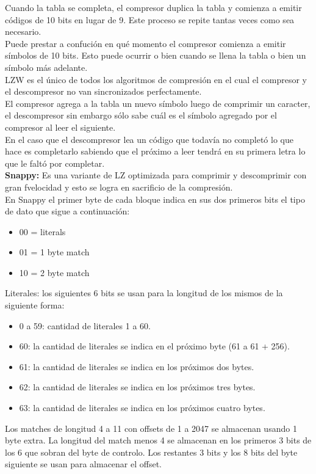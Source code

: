 \documentclass[titlepage,a4paper]{article}
\begin{document}
Cuando la tabla se completa, el compresor duplica la tabla y comienza a emitir códigos de 10 bits en lugar de 9. Este proceso se repite tantas veces como sea necesario. \\

Puede prestar a confución en qué momento el compresor comienza a emitir símbolos de 10 bits. Esto puede ocurrir o bien cuando se llena la tabla o bien un símbolo más adelante. \\

LZW es el único de todos los algoritmos de compresión en el cual el compresor y el descompresor no van sincronizados perfectamente. \\
El compresor agrega a la tabla un nuevo símbolo luego de comprimir un caracter, el descompresor sin embargo sólo sabe cuál es el símbolo agregado por el compresor al leer el siguiente. \\

En el caso que el descompresor lea un código que todavía no completó lo que hace es completarlo sabiendo que el próximo a leer tendrá en su primera letra lo que le faltó por completar. \\

\textbf{Snappy:} Es una variante de LZ optimizada para comprimir y descomprimir con gran fvelocidad y esto se logra en sacrificio de la compresión. \\

En Snappy el primer byte de cada bloque indica en sus dos primeros bits el tipo de dato que sigue a continuación:
\begin{itemize}
\item 00 = literals
\item 01 = 1 byte match
\item 10 =  2 byte match
\end{itemize}
Literales: los siguientes 6 bits se usan para la longitud de los mismos de la siguiente forma: 
\begin{itemize}
\item 0 a 59: cantidad de literales 1 a 60. 
\item 60: la cantidad de literales se indica en el próximo byte (61 a 61 + 256). 
\item 61: la cantidad de literales se indica en los próximos dos bytes. 
\item 62: la cantidad de literales se indica en los próximos tres bytes. 
\item 63: la cantidad de literales se indica en los próximos cuatro bytes. 
\end{itemize}
Los matches de longitud 4 a 11 con offsets de 1 a 2047  se almacenan usando 1 byte extra.  La longitud del match menos 4 se almacenan en los primeros 3 bits de los 6 que sobran del byte de controlo. Los restantes 3 bits y los 8 bits del byte siguiente se usan para almacenar el offset. \\
\end{document}
